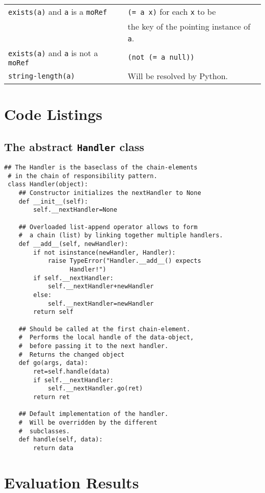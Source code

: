 \documentclass[12pt,swedish,english]{report}
\theoremstyle{definition}
\begin{document}
\begin{appendices}
\begin{center}
\begin{longtable}{|l|l|}
 \verb|exists(a)| and \verb|a| is a \verb|moRef| & \verb|(= a x)| for each \verb|x| to be \\
 & the key of the pointing instance of \verb|a|.\\ \hline
 
 \verb|exists(a)| and \verb|a| is not a \verb|moRef| &
 \verb|(not (= a null))| \\ \hline

 \verb|string-length(a)| &  Will be resolved by Python. \\ \hline
 \end{longtable}
 \end{center}
 
 \chapter{Code Listings}\label{app:code}
 
 \section*{The abstract \texttt{Handler} class}
 \begin{lstlisting}[label={lst:go},style=mypython]
 ## The Handler is the baseclass of the chain-elements
 # in the chain of responsibility pattern.
 class Handler(object):
 	## Constructor initializes the nextHandler to None
 	def __init__(self):
 		self.__nextHandler=None
 		
 	## Overloaded list-append operator allows to form 
 	#  a chain (list) by linking together multiple handlers.
 	def __add__(self, newHandler):
 		if not isinstance(newHandler, Handler):
 			raise TypeError("Handler.__add__() expects
 			      Handler!")
 		if self.__nextHandler:
 			self.__nextHandler+newHandler
 		else:
 			self.__nextHandler=newHandler
 		return self
 		
 	## Should be called at the first chain-element.
 	#  Performs the local handle of the data-object, 
 	#  before passing it to the next handler.
 	#  Returns the changed object
 	def go(args, data):
 		ret=self.handle(data)
 		if self.__nextHandler:
 			self.__nextHandler.go(ret)
 		return ret
 		
 	## Default implementation of the handler.
 	#  Will be overridden by the different
 	#  subclasses.
 	def handle(self, data):
 		return data
 \end{lstlisting}
 
\chapter{Evaluation Results}\label{app:results}


\end{appendices}
\end{document}
